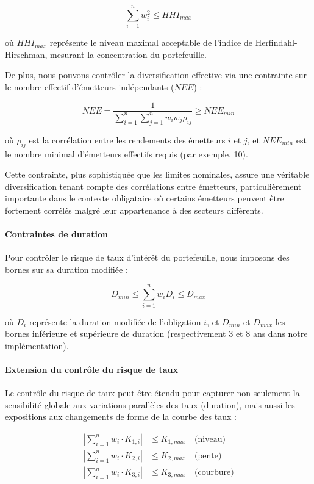 \begin{equation}
\sum_{i=1}^{n} w_i^2 \leq HHI_{max}
\end{equation}

où $HHI_{max}$ représente le niveau maximal acceptable de l'indice de Herfindahl-Hirschman, mesurant la concentration du portefeuille.

De plus, nous pouvons contrôler la diversification effective via une contrainte sur le nombre effectif d'émetteurs indépendants ($NEE$) :

\begin{equation}
NEE = \frac{1}{\sum_{i=1}^{n} \sum_{j=1}^{n} w_i w_j \rho_{ij}} \geq NEE_{min}
\end{equation}

où $\rho_{ij}$ est la corrélation entre les rendements des émetteurs $i$ et $j$, et $NEE_{min}$ est le nombre minimal d'émetteurs effectifs requis (par exemple, 10).

Cette contrainte, plus sophistiquée que les limites nominales, assure une véritable diversification tenant compte des corrélations entre émetteurs, particulièrement importante dans le contexte obligataire où certains émetteurs peuvent être fortement corrélés malgré leur appartenance à des secteurs différents.

\paragraph{Contraintes de duration} 
Pour contrôler le risque de taux d'intérêt du portefeuille, nous imposons des bornes sur sa duration modifiée :

\begin{equation}
D_{min} \leq \sum_{i=1}^n w_i D_i \leq D_{max}
\end{equation}

où $D_i$ représente la duration modifiée de l'obligation $i$, et $D_{min}$ et $D_{max}$ les bornes inférieure et supérieure de duration (respectivement 3 et 8 ans dans notre implémentation).

\paragraph{Extension du contrôle du risque de taux}
Le contrôle du risque de taux peut être étendu pour capturer non seulement la sensibilité globale aux variations parallèles des taux (duration), mais aussi les expositions aux changements de forme de la courbe des taux :

\begin{align}
\left|\sum_{i=1}^{n} w_i \cdot K_{1,i}\right| &\leq K_{1,max} \quad \text{(niveau)} \\
\left|\sum_{i=1}^{n} w_i \cdot K_{2,i}\right| &\leq K_{2,max} \quad \text{(pente)} \\
\left|\sum_{i=1}^{n} w_i \cdot K_{3,i}\right| &\leq K_{3,max} \quad \text{(courbure)}
\end{align}

